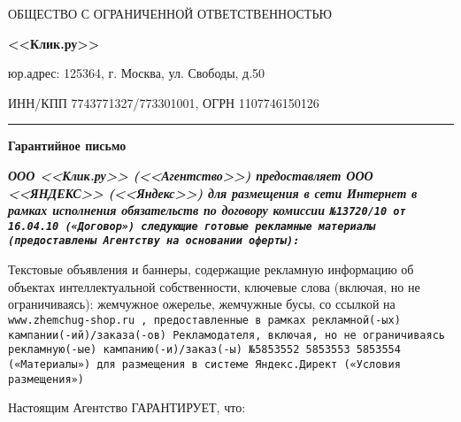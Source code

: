



\begin{center}
\large{ОБЩЕСТВО С ОГРАНИЧЕННОЙ ОТВЕТСТВЕННОСТЬЮ}

\Huge{\textbf{<<Клик.ру>>}}
\end{center}

\begin{small}
юр.адрес:  125364, г. Москва, ул. Свободы, д.50

ИНН/КПП 7743771327/773301001, ОГРН 1107746150126
\end{small}

\vspace{0.5em}

\hrule height 1pt

\vspace{1em}

\begin{center}\textbf{Гарантийное письмо}\end{center}

\noindent
\bf\sl ООО <<Клик.ру>> \rm (<<Агентство>>) предоставляет
\bf\sl ООО <<ЯНДЕКС>> \rm (<<Яндекс>>) для размещения в сети
Интернет в рамках исполнения обязательств по договору
комиссии \tt №13720/10 \rm от \tt 16.04.10 \rm \lb («Договор») следующие
готовые рекламные материалы (предоставлены Агентству на \lb основании оферты):

\vspace{1em}

\noindent
\rm Текстовые объявления и баннеры, содержащие рекламную информацию об объектах
интеллектуальной собственности, ключевые слова (включая, но не ограничиваясь):
жемчужное ожерелье, жемчужные бусы, со ссылкой на \tt www.zhemchug-shop.ru \rm,
предоставленные в рамках рекламной(-ых) кампании(-ий)/заказа(-ов)
Рекламодателя, включая, но не ограничиваясь рекламную(-ые) кампанию(-и)/заказ(-ы)
\tt №5853552 5853553 5853554 \rm («Материалы») для размещения в
системе Яндекс.Директ («Условия размещения»)

\vspace{1em}

\noindent
Настоящим Агентство ГАРАНТИРУЕТ, что:


